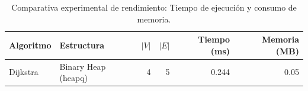 \begin{table}[H]
    \centering
    \fontsize{10}{12.5}\selectfont
    \caption{Comparativa experimental de rendimiento: Tiempo de ejecución y consumo de memoria.}
    \label{tab:comparativa_rendimiento}
    \begin{tabular}{@{}llrrrr@{}}
        \toprule
        \textbf{Algoritmo} & \textbf{Estructura} & \textbf{$|V|$} & \textbf{$|E|$} & \textbf{Tiempo (ms)} & \textbf{Memoria (MB)} \\
        \midrule
        Dijkstra & Binary Heap (heapq) & 4 & 5 & 0.244 & 0.05 \\
        \bottomrule
    \end{tabular}
\end{table}
